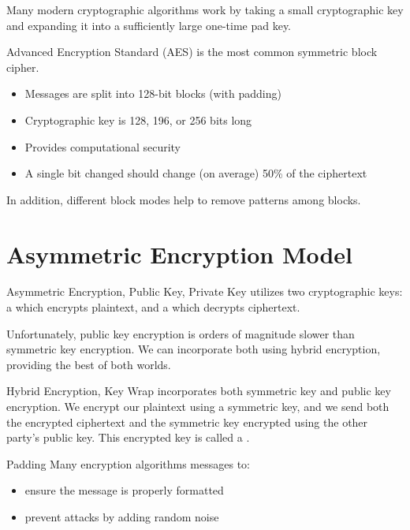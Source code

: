 Many modern cryptographic algorithms work by taking a small cryptographic key and expanding it into a sufficiently large one-time pad key.

\begin{dfnbox}{Advanced Encryption Standard (AES)}{}
     is the most common symmetric block cipher.
    \begin{itemize}[noitemsep]
        \item Messages are split into 128-bit blocks (with padding)
        \item Cryptographic key is 128, 196, or 256 bits long
        \item Provides computational security
        \item A single bit changed should change (on average) 50\% of the ciphertext
    \end{itemize}
    In addition, different block modes help to remove patterns among blocks.
\end{dfnbox}

\section{Asymmetric Encryption Model}

\begin{dfnbox}{Asymmetric Encryption, Public Key, Private Key}{}
     utilizes two cryptographic keys: a  which encrypts plaintext, and a  which decrypts ciphertext.
\end{dfnbox}

Unfortunately, public key encryption is orders of magnitude slower than symmetric key encryption. We can incorporate both using hybrid encryption, providing the best of both worlds.

\begin{dfnbox}{Hybrid Encryption, Key Wrap}{}
     incorporates both symmetric key and public key encryption. We encrypt our plaintext using a symmetric key, and we send both the encrypted ciphertext and the symmetric key encrypted using the other party's public key. This encrypted key is called a .
\end{dfnbox}

\begin{dfnbox}{Padding}{}
    Many encryption algorithms  messages to:
    \begin{itemize}[noitemsep]
        \item ensure the message is properly formatted
        \item prevent attacks by adding random noise
    \end{itemize}
\end{dfnbox}

